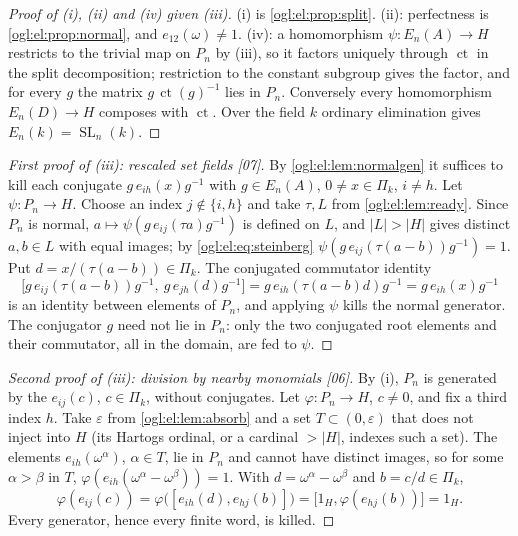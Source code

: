 \documentclass[11pt,oneside]{article}
\numberwithin{equation}{section}
\theoremstyle{definition}
\theoremstyle{remark}
\newcommand{\ct}{\operatorname{ct}}
\newcommand{\SL}{\operatorname{SL}}
\newcommand{\src}[1]{\textup{\textsf{\small[#1]}}}
\begin{document}
\begin{proof}[Proof of (i), (ii) and (iv) given (iii)]
(i) is \cref{ogl:el:prop:split}. (ii): perfectness is
\cref{ogl:el:prop:normal}, and $e_{12}(\omega)\ne1$. (iv): a homomorphism
$\psi:E_n(A)\to H$ restricts to the trivial map on $P_n$ by (iii), so it
factors uniquely through $\ct$ in the split decomposition; restriction to the
constant subgroup gives the factor, and for every $g$ the matrix
$g\,\ct(g)^{-1}$ lies in $P_n$. Conversely every homomorphism $E_n(D)\to H$
composes with $\ct$. Over the field $k$ ordinary elimination gives
$E_n(k)=\SL_n(k)$.
\end{proof}

\begin{proof}[First proof of (iii): rescaled set fields \src{07}]
By \cref{ogl:el:lem:normalgen} it suffices to kill each conjugate
$g\,e_{ih}(x)g^{-1}$ with $g\in E_n(A)$, $0\ne x\in\Pi_k$, $i\ne h$. Let
$\psi:P_n\to H$. Choose an index $j\notin\{i,h\}$ and take $\tau,L$ from
\cref{ogl:el:lem:ready}. Since $P_n$ is normal,
$a\mapsto\psi(g\,e_{ij}(\tau a)g^{-1})$ is defined on $L$, and $|L|>|H|$ gives
distinct $a,b\in L$ with equal images; by \eqref{ogl:el:eq:steinberg}
$\psi(g\,e_{ij}(\tau(a-b))g^{-1})=1$. Put $d=x/(\tau(a-b))\in\Pi_k$. The
conjugated commutator identity
\[
 \bigl[g\,e_{ij}(\tau(a-b))g^{-1},\ g\,e_{jh}(d)g^{-1}\bigr]
 =g\,e_{ih}(\tau(a-b)d)g^{-1}=g\,e_{ih}(x)g^{-1}
\]
is an identity between elements of $P_n$, and applying $\psi$ kills the normal
generator. The conjugator $g$ need not lie in $P_n$: only the two conjugated
root elements and their commutator, all in the domain, are fed to $\psi$.
\end{proof}

\begin{proof}[Second proof of (iii): division by nearby monomials \src{06}]
By (i), $P_n$ is generated by the $e_{ij}(c)$, $c\in\Pi_k$, without conjugates.
Let $\varphi:P_n\to H$, $c\ne0$, and fix a third index $h$. Take $\varepsilon$
from \cref{ogl:el:lem:absorb} and a set $T\subset(0,\varepsilon)$ that does not
inject into $H$ (its Hartogs ordinal, or a cardinal $>|H|$, indexes such a
set). The elements $e_{ih}(\omega^\alpha)$, $\alpha\in T$, lie in $P_n$ and
cannot have distinct images, so for some $\alpha>\beta$ in $T$,
$\varphi(e_{ih}(\omega^\alpha-\omega^\beta))=1$. With
$d=\omega^\alpha-\omega^\beta$ and $b=c/d\in\Pi_k$,
\[
 \varphi(e_{ij}(c))=\varphi\bigl([e_{ih}(d),e_{hj}(b)]\bigr)
 =\bigl[1_H,\varphi(e_{hj}(b))\bigr]=1_H .
\]
Every generator, hence every finite word, is killed.
\end{proof}
\end{document}
